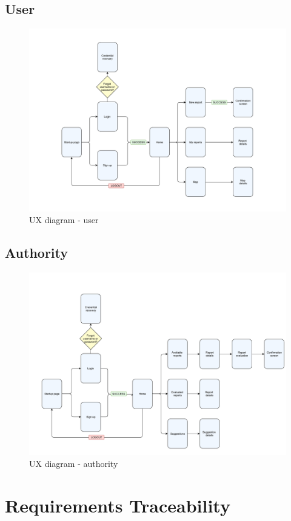 \documentclass[12pt,a4paper]{report}
\begin{document}
	\section{User}
		\begin{figure}[H]
				\includegraphics[scale = 0.65, center]{userux}
				\caption{UX diagram - user}
		\end{figure}
	\section{Authority}
		\begin{figure}[H]
				\includegraphics[scale = 0.6, center]{authorityux}
				\caption{UX diagram - authority}
		\end{figure}

	\chapter{Requirements Traceability}
\end{document}
